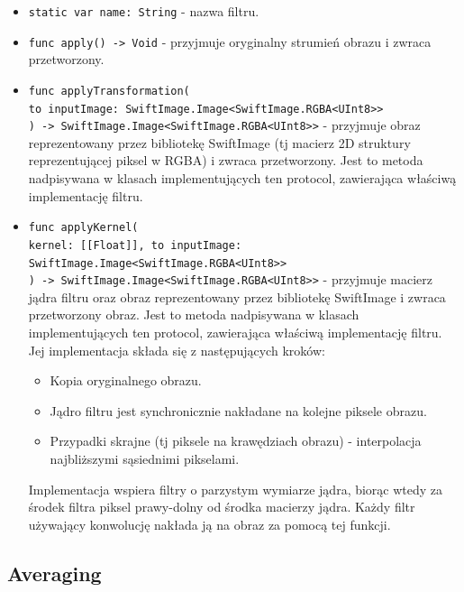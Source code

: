 \documentclass[a4paper]{article}
\begin{document}
\begin{itemize}
    \item \texttt{static var name: String} - nazwa filtru.
    \item \texttt{func apply() -> Void} - przyjmuje oryginalny strumień obrazu i zwraca przetworzony.
    \item \texttt{func applyTransformation(\\to inputImage: SwiftImage.Image<SwiftImage.RGBA<UInt8>>\\) -> SwiftImage.Image<SwiftImage.RGBA<UInt8>>} - przyjmuje obraz reprezentowany przez bibliotekę SwiftImage (tj macierz 2D struktury reprezentującej piksel w RGBA) i zwraca przetworzony. Jest to metoda nadpisywana w klasach implementujących ten protocol, zawierająca właściwą implementację filtru.
    \item \texttt{func applyKernel(\\kernel: [[Float]], to inputImage: SwiftImage.Image<SwiftImage.RGBA<UInt8>>\\) -> SwiftImage.Image<SwiftImage.RGBA<UInt8>>} - przyjmuje macierz jądra filtru oraz obraz reprezentowany przez bibliotekę SwiftImage i zwraca przetworzony obraz. Jest to metoda nadpisywana w klasach implementujących ten protocol, zawierająca właściwą implementację filtru. Jej implementacja składa się z następujących kroków:
          \begin{itemize}
              \item Kopia oryginalnego obrazu.
              \item Jądro filtru jest synchronicznie nakładane na kolejne piksele obrazu.
              \item Przypadki skrajne (tj piksele na krawędziach obrazu) - interpolacja najbliższymi sąsiednimi pikselami.
          \end{itemize}
          Implementacja wspiera filtry o parzystym wymiarze jądra, biorąc wtedy za środek filtra piksel prawy-dolny od środka macierzy jądra.
          Każdy filtr używający konwolucję nakłada ją na obraz za pomocą tej funkcji.
\end{itemize}

\subsection{Averaging}
\end{document}

